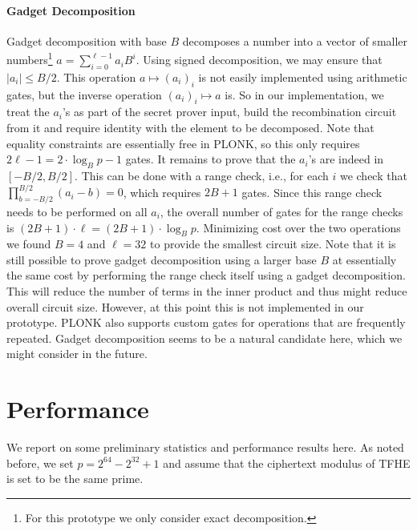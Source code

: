 \documentclass{zamarep}
\begin{document}
\paragraph{Gadget Decomposition}
Gadget decomposition with base $B$ decomposes a number into a vector of smaller numbers\footnote{For this prototype we only consider exact decomposition.} $a = \sum_{i = 0}^{\ell-1} a_i B^i$. Using signed decomposition, we may ensure that $\lvert a_i \rvert \leq B/2$. This operation $a \mapsto (a_i)_i$ is not easily implemented using arithmetic gates, but the inverse operation $(a_i)_i \mapsto a$ is. So in our implementation, we treat the $a_i$'s as part of the secret prover input, build the recombination circuit from it and require identity with the element to be decomposed. Note that equality constraints are essentially free in PLONK, so this only requires $2 \ell - 1 = 2 \cdot \log_B p - 1$ gates. It remains to prove that the $a_i$'s are indeed in $[-B/2, B/2]$. This can be done with a range check, i.e., for each $i$ we check that $\prod_{b = -B/2}^{B/2} (a_i - b) = 0$, which requires $2B + 1$ gates. Since this range check needs to be performed on all $a_i$, the overall number of gates for the range checks is $(2B + 1) \cdot \ell = (2B + 1) \cdot \log_B p $. Minimizing cost over the two operations we found $B = 4$ and $\ell = 32$ to provide the smallest circuit size. Note that it is still possible to prove gadget decomposition using a larger base $B$ at essentially the same cost by performing the range check itself using a gadget decomposition. This will reduce the number of terms in the inner product and thus might reduce overall circuit size. However, at this point this is not implemented in our prototype. PLONK also supports custom gates for operations that are frequently repeated. Gadget decomposition seems to be a natural candidate here, which we might consider in the future.

\section{Performance}

We report on some preliminary statistics and performance results here. As noted before, we set $p = 2^{64} - 2^{32} + 1$ and assume that the ciphertext modulus of TFHE is set to be the same prime. 
\end{document}

